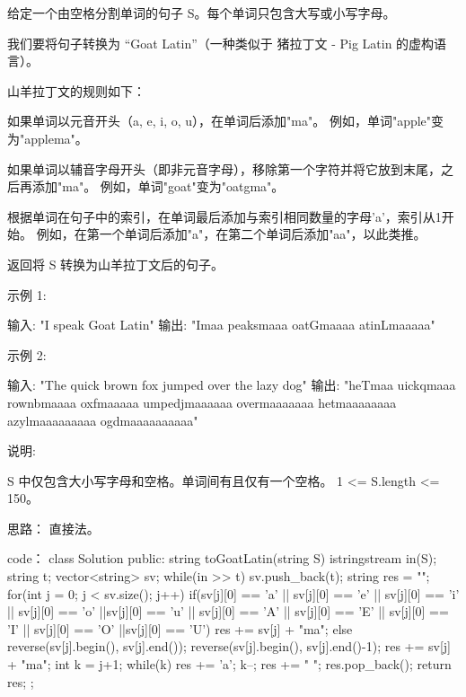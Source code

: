 给定一个由空格分割单词的句子 S。每个单词只包含大写或小写字母。

我们要将句子转换为 “Goat Latin”（一种类似于 猪拉丁文 - Pig Latin 的虚构语言）。

山羊拉丁文的规则如下：

    如果单词以元音开头（a, e, i, o, u），在单词后添加"ma"。
    例如，单词"apple"变为"applema"。

    如果单词以辅音字母开头（即非元音字母），移除第一个字符并将它放到末尾，之后再添加"ma"。
    例如，单词"goat"变为"oatgma"。

    根据单词在句子中的索引，在单词最后添加与索引相同数量的字母'a'，索引从1开始。
    例如，在第一个单词后添加"a"，在第二个单词后添加"aa"，以此类推。

返回将 S 转换为山羊拉丁文后的句子。

示例 1:

输入: "I speak Goat Latin"
输出: "Imaa peaksmaaa oatGmaaaa atinLmaaaaa"

示例 2:

输入: "The quick brown fox jumped over the lazy dog"
输出: "heTmaa uickqmaaa rownbmaaaa oxfmaaaaa umpedjmaaaaaa overmaaaaaaa hetmaaaaaaaa azylmaaaaaaaaa ogdmaaaaaaaaaa"

说明:

    S 中仅包含大小写字母和空格。单词间有且仅有一个空格。
    1 <= S.length <= 150。




















思路：
直接法。



















code：
class Solution {
public:
    string toGoatLatin(string S) {
        istringstream in(S);
        string t;
        vector<string> sv;
        while(in >> t)
            sv.push_back(t);
        string res = "";
        for(int j = 0; j < sv.size(); j++)
        {
            if(sv[j][0] == 'a' || sv[j][0] == 'e' || sv[j][0] == 'i' || sv[j][0] == 'o' ||sv[j][0] == 'u' || sv[j][0] == 'A' || sv[j][0] == 'E' || sv[j][0] == 'I' || sv[j][0] == 'O' ||sv[j][0] == 'U')
            {
                res += sv[j] + "ma";
            }
            else
            {
                reverse(sv[j].begin(), sv[j].end());
                reverse(sv[j].begin(), sv[j].end()-1);
                res += sv[j] + "ma";
            }
            int k = j+1;
            while(k)
            {
                res += 'a'; k--;
            }
            res += " ";
        }
        res.pop_back();
        return res;
    }
};